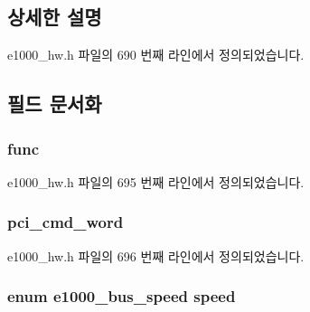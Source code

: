 \subsection{상세한 설명}


e1000\+\_\+hw.\+h 파일의 690 번째 라인에서 정의되었습니다.



\subsection{필드 문서화}
\subsubsection[{\texorpdfstring{func}{func}}]{ func}\hypertarget{structe1000__bus__info_aa0e8a98481733fa11b6a46a53b2a3e41}{}\label{structe1000__bus__info_aa0e8a98481733fa11b6a46a53b2a3e41}


e1000\+\_\+hw.\+h 파일의 695 번째 라인에서 정의되었습니다.

\subsubsection[{\texorpdfstring{pci\+\_\+cmd\+\_\+word}{pci_cmd_word}}]{ pci\+\_\+cmd\+\_\+word}\hypertarget{structe1000__bus__info_abb56f96e770a8e41d7f0de05f2a93a33}{}\label{structe1000__bus__info_abb56f96e770a8e41d7f0de05f2a93a33}


e1000\+\_\+hw.\+h 파일의 696 번째 라인에서 정의되었습니다.

\subsubsection[{\texorpdfstring{speed}{speed}}]{\setlength{\rightskip}{0pt plus 5cm}enum {\bf e1000\+\_\+bus\+\_\+speed} speed}\hypertarget{structe1000__bus__info_a4b59af6a3a89438279fb7944d1b74f8f}{}\label{structe1000__bus__info_a4b59af6a3a89438279fb7944d1b74f8f}


